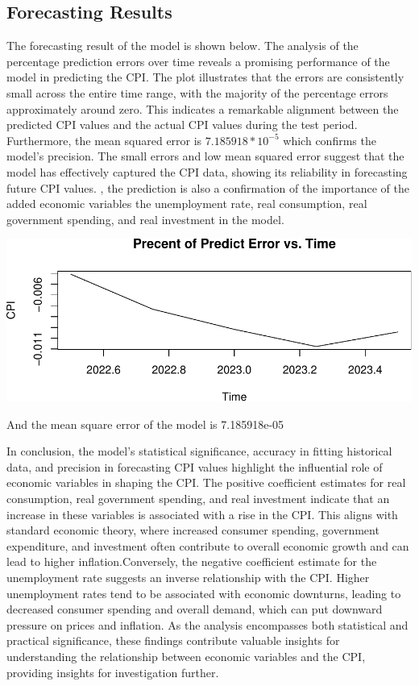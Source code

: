 \documentclass[
  man,floatsintext,
  man]{apa6}
\begin{document}
\hypertarget{forecasting-results}{%
\subsection{Forecasting Results}\label{forecasting-results}}

The forecasting result of the model is shown below. The analysis of the percentage prediction errors over time reveals a promising performance of the model in predicting the CPI. The plot illustrates that the errors are consistently small across the entire time range, with the majority of the percentage errors approximately around zero. This indicates a remarkable alignment between the predicted CPI values and the actual CPI values during the test period. Furthermore, the mean squared error is \(7.185918*10^{-5}\) which confirms the model's precision. The small errors and low mean squared error suggest that the model has effectively captured the CPI data, showing its reliability in forecasting future CPI values. , the prediction is also a confirmation of the importance of the added economic variables the unemployment rate, real consumption, real government spending, and real investment in the model.

\includegraphics{stat429_group2_final_proj_files/figure-latex/unnamed-chunk-7-1.pdf}

And the mean square error of the model is 7.185918e-05

In conclusion, the model's statistical significance, accuracy in fitting historical data, and precision in forecasting CPI values highlight the influential role of economic variables in shaping the CPI. The positive coefficient estimates for real consumption, real government spending, and real investment indicate that an increase in these variables is associated with a rise in the CPI. This aligns with standard economic theory, where increased consumer spending, government expenditure, and investment often contribute to overall economic growth and can lead to higher inflation.Conversely, the negative coefficient estimate for the unemployment rate suggests an inverse relationship with the CPI. Higher unemployment rates tend to be associated with economic downturns, leading to decreased consumer spending and overall demand, which can put downward pressure on prices and inflation. As the analysis encompasses both statistical and practical significance, these findings contribute valuable insights for understanding the relationship between economic variables and the CPI, providing insights for investigation further.
\end{document}
